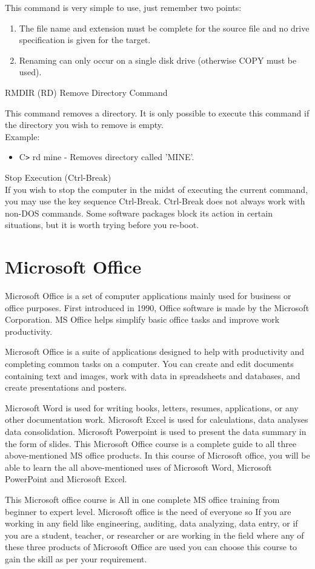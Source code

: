 \documentclass[11pt,a4paper,twoside]{article}
\begin{document}
This command is very simple to use, just remember two points:
\begin{enumerate}
    \item The file name and extension must be complete for the source file and no drive specification is given for the target.
    \item Renaming can only occur on a single disk drive (otherwise COPY must be used).
\end{enumerate}
RMDIR (RD) Remove Directory Command\par
This command removes a directory. It is only possible to execute this command if the directory you wish to remove is empty.\\
Example:
\begin{itemize}
    \item C\verb=>= rd mine - Removes directory called 'MINE'.
\end{itemize}
Stop Execution (Ctrl-Break)\\
If you wish to stop the computer in the midst of executing the current command, you may use the key sequence Ctrl-Break. Ctrl-Break does not always work with non-DOS commands. Some software packages block its action in certain situations, but it is worth trying before you re-boot.
\newpage
\part{Microsoft Office}
Microsoft Office is a set of computer applications mainly used for business or office purposes. First introduced in 1990, Office software is made by the Microsoft Corporation. MS Office helps simplify basic office tasks and improve work productivity.\par
Microsoft Office is a suite of applications designed to help with productivity and completing common tasks on a computer. You can create and edit documents containing text and images, work with data in spreadsheets and databases, and create presentations and posters.\par
Microsoft Word is used for writing books, letters, resumes, applications, or any other documentation work. Microsoft Excel is used for calculations, data analyses  data consolidation. Microsoft Powerpoint is used to present the data summary in the form of slides. This Microsoft Office course is a complete guide to all three above-mentioned MS office products. In this course of Microsoft office, you will be able to learn the all above-mentioned uses of Microsoft Word, Microsoft PowerPoint and Microsoft Excel.\par
This Microsoft office course is All in one complete MS office training from beginner to expert level. Microsoft office is the need of everyone so If you are working in any field like engineering, auditing, data analyzing, data entry, or if you are a student, teacher, or researcher or are working in the field where any of these three products of Microsoft Office are used you can choose this course to gain the skill as per your requirement.
\end{document}
